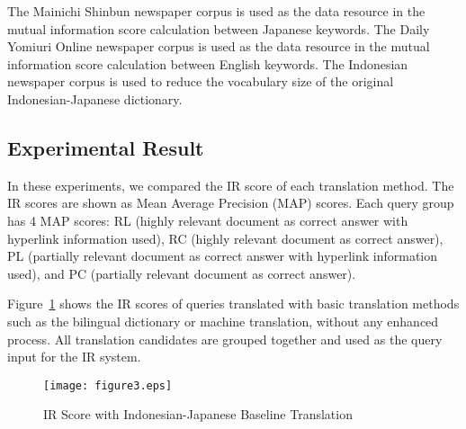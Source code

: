 \documentclass[english]{jnlp_1.3c}
\begin{document}
The Mainichi Shinbun newspaper corpus is used as the data resource in
the mutual information score calculation between Japanese keywords. The
Daily Yomiuri Online newspaper corpus is used as the data resource in
the mutual information score calculation between English keywords. The
Indonesian newspaper corpus is used to reduce the vocabulary size of the
original Indonesian-Japanese dictionary.


\subsection{Experimental Result}
\label{Experimental Result} In these experiments, we compared the IR
score of each translation method. The IR scores are shown as Mean
Average Precision (MAP) scores. Each query group has 4 MAP scores: RL
(highly relevant document as correct answer with hyperlink information
used), RC (highly relevant document as correct answer), PL (partially
relevant document as correct answer with hyperlink information used),
and PC (partially relevant document as correct answer).

Figure~\ref{fig:3} shows the IR scores of queries translated with basic
translation methods such as the bilingual dictionary or machine
translation, without any enhanced process. All translation candidates
are grouped together and used as the query input for the IR system.

\begin{figure}[t]
 \begin{center}
   \texttt{[image: figure3.eps]}
 \end{center}
 \caption{IR Score with Indonesian-Japanese Baseline Translation}
 \label{fig:3}
\end{figure}
\end{document}
